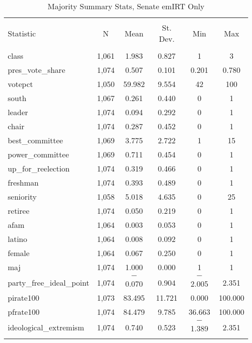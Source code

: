 \documentclass[12pt]{article}
\begin{document}
\begin{table}[!htbp] \centering 
	\caption{Majority Summary Stats, Senate emIRT Only} 
	\label{} 
	\begin{tabular}{@{\extracolsep{5pt}}lccccc} 
		\\[-1.8ex]\hline 
		\hline \\[-1.8ex] 
		Statistic & \multicolumn{1}{c}{N} & \multicolumn{1}{c}{Mean} & \multicolumn{1}{c}{St. Dev.} & \multicolumn{1}{c}{Min} & \multicolumn{1}{c}{Max} \\ 
		\hline \\[-1.8ex] 
		class & 1,061 & 1.983 & 0.827 & 1 & 3 \\ 
		pres\_vote\_share & 1,074 & 0.507 & 0.101 & 0.201 & 0.780 \\ 
		votepct & 1,050 & 59.982 & 9.554 & 42 & 100 \\ 
		south & 1,067 & 0.261 & 0.440 & 0 & 1 \\ 
		leader & 1,074 & 0.094 & 0.292 & 0 & 1 \\ 
		chair & 1,074 & 0.287 & 0.452 & 0 & 1 \\ 
		best\_committee & 1,069 & 3.775 & 2.722 & 1 & 15 \\ 
		power\_committee & 1,069 & 0.711 & 0.454 & 0 & 1 \\ 
		up\_for\_reelection & 1,074 & 0.319 & 0.466 & 0 & 1 \\ 
		freshman & 1,074 & 0.393 & 0.489 & 0 & 1 \\ 
		seniority & 1,058 & 5.018 & 4.635 & 0 & 25 \\ 
		retiree & 1,074 & 0.050 & 0.219 & 0 & 1 \\ 
		afam & 1,064 & 0.003 & 0.053 & 0 & 1 \\ 
		latino & 1,064 & 0.008 & 0.092 & 0 & 1 \\ 
		female & 1,064 & 0.067 & 0.250 & 0 & 1 \\ 
		maj & 1,074 & 1.000 & 0.000 & 1 & 1 \\ 
		party\_free\_ideal\_point & 1,074 & $-$0.070 & 0.904 & $-$2.005 & 2.351 \\ 
		pirate100 & 1,073 & 83.495 & 11.721 & 0.000 & 100.000 \\ 
		pfrate100 & 1,074 & 84.479 & 9.785 & 36.663 & 100.000 \\ 
		ideological\_extremism & 1,074 & 0.740 & 0.523 & $-$1.389 & 2.351 \\ 
		\hline \\[-1.8ex] 
	\end{tabular} 
\end{table} 
\end{document}
